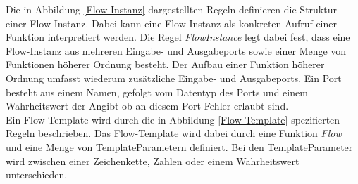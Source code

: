     Die in Abbildung \ref{Flow-Instanz} dargestellten Regeln definieren die Struktur einer Flow-Instanz. Dabei kann eine Flow-Instanz als konkreten Aufruf einer Funktion interpretiert werden. 
    Die Regel \textit{FlowInstance} legt dabei fest, dass eine Flow-Instanz aus mehreren Eingabe- und Ausgabeports sowie einer Menge von Funktionen höherer Ordnung besteht.
    Der Aufbau einer Funktion höherer Ordnung umfasst wiederum zusätzliche Eingabe- und Ausgabeports.
    Ein Port besteht aus einem Namen, gefolgt vom Datentyp des Ports und einem Wahrheitswert der Angibt ob an diesem Port Fehler erlaubt sind.\\
    Ein Flow-Template wird durch die in Abbildung \ref{Flow-Template} spezifierten Regeln beschrieben.
    Das Flow-Template wird dabei durch eine Funktion \textit{Flow} und eine Menge von TemplateParametern definiert. 
    Bei den TemplateParameter wird zwischen einer Zeichenkette, Zahlen oder einem Wahrheitswert unterschieden. 
